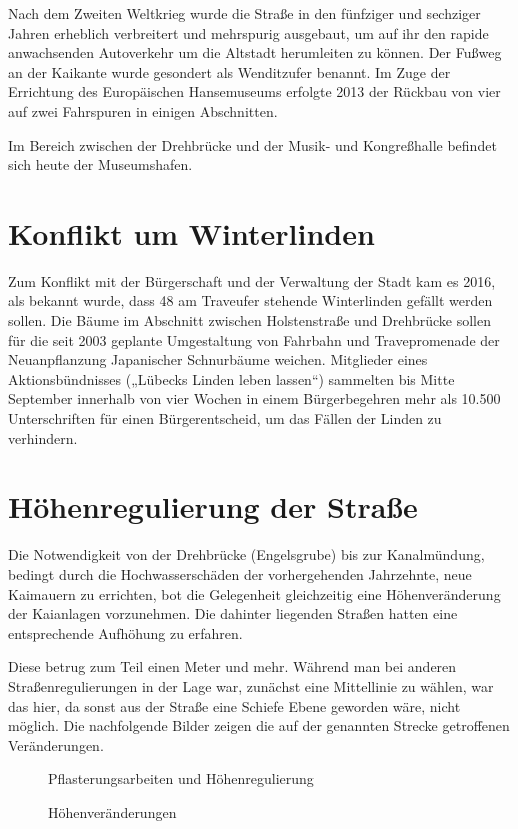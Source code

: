 Nach dem Zweiten Weltkrieg wurde die Straße in den fünfziger und sechziger Jahren erheblich verbreitert und mehrspurig ausgebaut, um auf ihr den rapide anwachsenden Autoverkehr um die Altstadt herumleiten zu können. Der Fußweg an der Kaikante wurde gesondert als Wenditzufer benannt. Im Zuge der Errichtung des Europäischen Hansemuseums erfolgte 2013 der Rückbau von vier auf zwei Fahrspuren in einigen Abschnitten.

Im Bereich zwischen der Drehbrücke und der Musik- und Kongreßhalle befindet sich heute der Museumshafen.

\section{Konflikt um Winterlinden}

Zum Konflikt mit der Bürgerschaft und der Verwaltung der Stadt kam es 2016, als bekannt wurde, dass 48 am Traveufer stehende Winterlinden gefällt werden sollen. Die Bäume im Abschnitt zwischen Holstenstraße und Drehbrücke sollen für die seit 2003 geplante Umgestaltung von Fahrbahn und Travepromenade der Neuanpflanzung Japanischer Schnurbäume weichen. \cite{llll}
Mitglieder eines Aktionsbündnisses („Lübecks Linden leben lassen“) sammelten bis Mitte September innerhalb von vier Wochen in einem Bürgerbegehren mehr als 10.500 Unterschriften für einen Bürgerentscheid, um das Fällen der Linden zu verhindern. \cite{lindensave}

\section{Höhenregulierung der Straße}

Die Notwendigkeit von der Drehbrücke (Engelsgrube) bis zur Kanalmündung, bedingt durch die Hochwasserschäden der vorhergehenden Jahrzehnte, neue Kaimauern zu errichten, bot die Gelegenheit gleichzeitig eine Höhenveränderung der Kaianlagen vorzunehmen. Die dahinter liegenden Straßen hatten eine entsprechende Aufhöhung zu erfahren.

Diese betrug zum Teil einen Meter und mehr. Während man bei anderen Straßenregulierungen in der Lage war, zunächst eine Mittellinie zu wählen, war das hier, da sonst aus der Straße eine Schiefe Ebene geworden wäre, nicht möglich. Die nachfolgende Bilder zeigen die auf der genannten Strecke getroffenen Veränderungen.

\begin{figure}
  \centering
  \caption[Pflasterungsarbeiten und Höhenregulierung]{Pflasterungsarbeiten und Höhenregulierung}
  \label{fig-pflasterungsarbeiten}
\end{figure}

\begin{figure}
  \centering
  \caption[Höhenveränderungen]{Höhenveränderungen}
  \label{fig-hoehenveraenderungen}
\end{figure}
